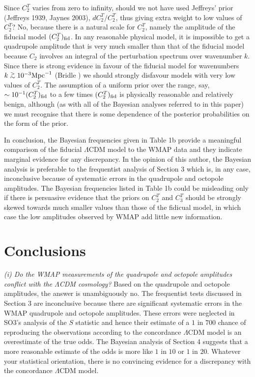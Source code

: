Since $C^T_2$ varies from zero to infinity, should we not have used
Jeffreys' prior (Jeffreys 1939, Jaynes 2003), $dC^T_2/C^T_2$, thus
giving extra weight to low values of $C^T_2$? No, because there is a
natural scale for $C^T_2$, namely the amplitude of the fiducial model
$(C^T_2)_{\rm fid}$. In any reasonable physical model, it is
impossible to get a quadrupole amplitude that is very much smaller
than that of the fiducial model because $C_2$ involves an integral of
the perturbation spectrum over wavenumber $k$. Since there is strong
evidence in favour of the fiducial model for wavenumbers $k \simgt
10^{-3} {\rm Mpc}^{-1}$ (Bridle ) we should strongly
disfavour models with very low values of $C^T_2$.  The assumption of a
uniform prior over the range, say, $\sim 10^{-1} (C^T_2)_{\rm fid}$ to
a few times $(C^T_2)_{\rm fid}$ is physically reasonable and
relatively benign, although (as with all of the Bayesian analyses
referred to in this paper) we must recognise that there is some
dependence of the posterior probabilities on the form of the prior.

In conclusion, the Bayesian frequencies given in Table 1b provide a
meaningful comparison of the fiducial $\Lambda$CDM model to the WMAP
data and they indicate marginal evidence for any discrepancy.  In the
opinion of this author, the Bayesian analysis is preferable to the
frequentist analysis of Section 3 which is, in any case,  inconclusive
because of systematic errors in the quadrupole and octopole
amplitudes. The Bayesian frequencies listed in Table 1b could be
misleading only if there is persuasive evidence that the priors on
$C^T_2$ and $C^T_3$ should be strongly skewed towards much smaller
values than those of the fidicual model, in which case the low
amplitudes observed by WMAP add little new information.







\section{Conclusions}

\smallskip

\noindent
{\it (i) Do the WMAP measurements of the quadrupole and octopole
amplitudes conflict with the $\Lambda$CDM cosmology?} Based on the quadrupole
and octopole amplitudes, the answer is
unambiguously no.  The frequentist tests discussed in Section 3 are
inconclusive because there are significant systematic errors in the
WMAP quadrupole and octopole amplitudes.  These errors were neglected
in SO3's analysis of the $S$ statistic and hence their estimate of a
$1$ in $700$ chance of reproducing the observations according to the
concordance $\Lambda$CDM model is an overestimate of the true
odds. The Bayesian analysis of Section 4 suggests that a more
reasonable estimate of the odds is more like $1$ in $10$ or $1$ in
$20$.   Whatever your statistical orientation, there is no 
convincing evidence for a discrepancy with the
concordance   $\Lambda$CDM model.

